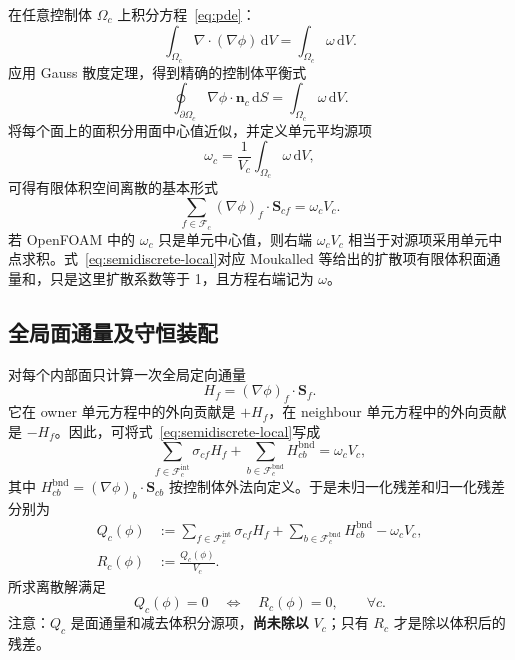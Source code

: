 \documentclass[UTF8,a4paper,11pt]{ctexart}
\newcommand{\vect}[1]{\bm{#1}}
\newcommand{\Sf}{\vect S_f}
\newcommand{\Scf}{\vect S_{cf}}
\begin{document}
在任意控制体 \(\Omega_c\) 上积分方程~\eqref{eq:pde}：
\begin{equation}
  \int_{\Omega_c}\nabla\!\cdot\!(\nabla\phi)\,\mathrm dV
  =\int_{\Omega_c}\omega\,\mathrm dV .
  \label{eq:cvint}
\end{equation}
应用 Gauss 散度定理，得到精确的控制体平衡式
\begin{equation}
  \oint_{\partial\Omega_c}\nabla\phi\cdot\vect n_c\,\mathrm dS
  =\int_{\Omega_c}\omega\,\mathrm dV .
  \label{eq:gauss}
\end{equation}
将每个面上的面积分用面中心值近似，并定义单元平均源项
\begin{equation}
  \omega_c=\frac{1}{V_c}\int_{\Omega_c}\omega\,\mathrm dV,
\end{equation}
可得有限体积空间离散的基本形式
\begin{equation}
  \boxed{
  \sum_{f\in\mathcal F_c}
  (\nabla\phi)_f\cdot\Scf
  =\omega_cV_c .}
  \label{eq:semidiscrete-local}
\end{equation}
若 OpenFOAM 中的 \(\omega_c\) 只是单元中心值，则右端 \(\omega_cV_c\) 相当于对源项采用单元中点求积。式~\eqref{eq:semidiscrete-local}对应 Moukalled 等\cite[第 8 章，式 (8.4)]{Moukalled2016}给出的扩散项有限体积面通量和，只是这里扩散系数等于 1，且方程右端记为 \(\omega\)。

\subsection{全局面通量及守恒装配}

对每个内部面只计算一次全局定向通量
\begin{equation}
  H_f=(\nabla\phi)_f\cdot\Sf .
  \label{eq:Hdef}
\end{equation}
它在 owner 单元方程中的外向贡献是 \(+H_f\)，在 neighbour 单元方程中的外向贡献是 \(-H_f\)。因此，可将式~\eqref{eq:semidiscrete-local}写成
\begin{equation}
  \sum_{f\in\mathcal F_c^{\mathrm{int}}}\sigma_{cf}H_f
  +\sum_{b\in\mathcal F_c^{\mathrm{bnd}}}H_{cb}^{\mathrm{bnd}}
  =\omega_cV_c ,
  \label{eq:globalfluxform}
\end{equation}
其中
\(H_{cb}^{\mathrm{bnd}}=(\nabla\phi)_b\cdot\vect S_{cb}\)
按控制体外法向定义。于是未归一化残差和归一化残差分别为
\begin{align}
  Q_c(\phi)
  &:=\sum_{f\in\mathcal F_c^{\mathrm{int}}}\sigma_{cf}H_f
  +\sum_{b\in\mathcal F_c^{\mathrm{bnd}}}H_{cb}^{\mathrm{bnd}}
  -\omega_cV_c,                                      \label{eq:Qc}\\
  R_c(\phi)&:=\frac{Q_c(\phi)}{V_c}.                 \label{eq:Rc}
\end{align}
所求离散解满足
\begin{equation}
  \boxed{Q_c(\phi)=0\quad\Longleftrightarrow\quad R_c(\phi)=0,
  \qquad \forall c.}
  \label{eq:reszero}
\end{equation}
注意：\(Q_c\) 是面通量和减去体积分源项，\textbf{尚未除以} \(V_c\)；只有 \(R_c\) 才是除以体积后的残差。
\end{document}

